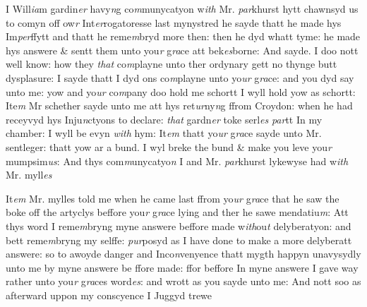 \documentclass[12pt, a4paper]{book}
\begin{document}
		\ifthenelse{\isodd{\thepage}}
		{\reversemarginpar}
		{\normalmarginpar}
		I Will\textit{ia}m gardin\textit{er} havy\textit{n}g co\textit{m}munycatyon w\textit{ith} Mr. \textit{par}khurst hytt
 chawnsyd us to comyn off ow\textit{r} Int\textit{er}rogatoresse last mynystred
 he sayde thatt he made hys Im\textit{per}ffytt and thatt he reme\textit{m}bryd
 more then: then he dyd whatt tyme: he made hys answere
 \& sentt them unto you\textit{r} g\textit{ra}ce att bek\textit{es}borne: And sayde. I
 doo nott well know: how they \textit{that} co\textit{m}playne unto ther ordynary
 gett no thynge butt dysplasure: I sayde thatt I dyd ons
 co\textit{m}playne unto yo\textit{ur} g\textit{ra}ce: and you dyd say unto me: yow
 and yo\textit{ur} co\textit{m}pany doo hold me schortt I wyll hold yow
					as schortt: Ite\textit{m} Mr schether sayde unto me att hys ret\textit{ur}ny\textit{n}g
 ffrom Croydon: when he had receyvyd hys Inju\textit{n}ctyons to
 declare: \textit{that} gardn\textit{er }toke serl\textit{es}
               \textit{par}tt In my chamber: I
					wyll be evyn \textit{with} hym: It\textit{em} thatt yo\textit{ur} g\textit{ra}ce sayde unto Mr.
 sentleger: thatt yow ar a bund. I wyl breke the bund \&
 make you leve you\textit{r} mumpsim\textit{us}: And thys com\textit{m}unycatyo\textit{n}
					I and Mr. \textit{par}khurst lykewyse had w\textit{ith} Mr. myll\textit{es}
            			
			

            		
            			
		\ifthenelse{\isodd{\thepage}}
		{\reversemarginpar}
		{\normalmarginpar}
		It\textit{em} Mr. mylles told me when he came last ffrom yo\textit{ur} g\textit{ra}ce
            				that he saw the boke off the artyclys beffore you\textit{r} g\textit{ra}ce lying
 and ther he sawe mendatiu\textit{m}: Att thys word I reme\textit{m}bryng
 myne answere beffore made w\textit{ith}ou\textit{t} delyberatyon: and bett
 reme\textit{m}bryng my selffe: \textit{pur}posyd as I have done to make
 a more delyberatt answere: so to awoyde danger and
 Inco\textit{n}venyence thatt mygth happyn unavysydly unto me
 by myne answere be ffore made: ffor beffore In myne answere
 I gave way rather unto you\textit{r} g\textit{ra}ces word\textit{es}: and wrott as you
 sayde unto me: And nott
			 soo as afterward uppon my conscyence I
 Juggyd trewe
            			
            		

\dotfill
					
\end{document}
